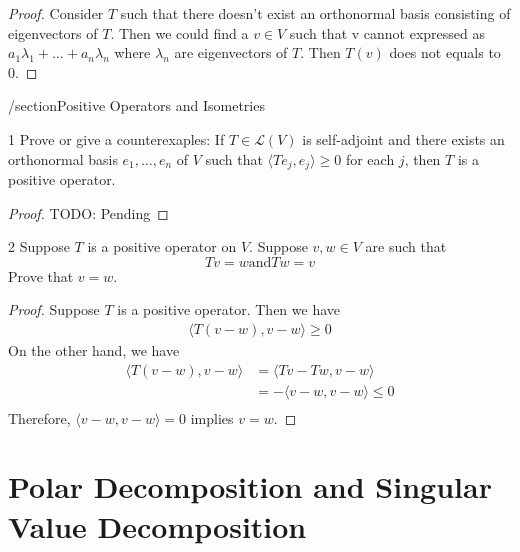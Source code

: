 \documentclass{article}
\newenvironment{problem}[1]{\begin{prob*}{#1}{}}{\end{prob*}}
\begin{document}
\begin{proof}
  Consider $T$ such that there doesn't exist an orthonormal basis consisting
  of eigenvectors of $T$. Then we could find a $v \in V$ such that v cannot expressed
  as $a_1 \lambda_1 + \dots + a_n \lambda_n$ where $\lambda_n$ are eigenvectors of $T$. Then $T(v)$ does not 
  equals to 0.
\end{proof}

/section{Positive Operators and Isometries}

\begin{problem}{1}
  Prove or give a counterexaples: If $T \in \mathcal{L}(V)$ is self-adjoint
  and there exists an orthonormal basis $e_1, \dots,e_n $ of $V$ such that 
  $\langle Te_j , e_j \rangle \geq 0$ for each $j$, then $T$ is a positive operator.
\end{problem}

\begin{proof}
  TODO: Pending
\end{proof}

\begin{problem}{2}
  Suppose $T$ is a positive operator on $V$. Suppose $v, w \in V$ are such that \[
    Tv = w \text{and} Tw = v \]
  Prove that $v = w$.
\end{problem}

\begin{proof}
  Suppose $T$ is a positive operator. Then we have
  \begin{equation*}
    \begin{aligned}
      \langle T(v-w), v-w \rangle \geq 0
    \end{aligned}
  \end{equation*}
  On the other hand, we have
  \begin{equation*}
    \begin{aligned}
      \langle T(v-w), v-w \rangle &= \langle Tv - Tw, v-w \rangle \\
      &= - \langle v - w, v-w \rangle \leq 0\\
    \end{aligned}
  \end{equation*}
  Therefore, $\langle v - w, v - w \rangle = 0$ implies $v = w$.
\end{proof}

\section{Polar Decomposition and Singular Value Decomposition}
\end{document}
